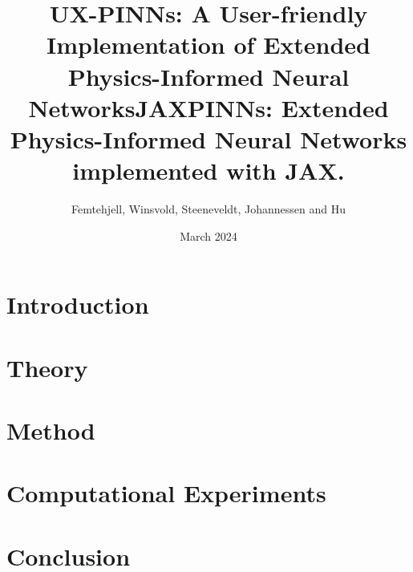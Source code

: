 \documentclass[aps,rmp,reprint,amsmath,amssymb,longbibliography,twocolumn,floatfix]{revtex4-1}
\begin{document}

\title{UX-PINNs: A User-friendly Implementation of Extended Physics-Informed Neural Networks}
\title{JAXPINNs: Extended Physics-Informed Neural Networks implemented with JAX.}

\author{Femtehjell, Winsvold, Steeneveldt, Johannessen and Hu}
\date{March 2024}


\begin{abstract}

\end{abstract}

\maketitle

\tableofcontents

\section{Introduction}
\label{sec:introduction}

\section{Theory}
\label{sec:theory}

\section{Method}
\label{sec:method}

\section{Computational Experiments}
\label{sec:compexp}

\section{Conclusion}
\label{sec:conclusion}

\newpage

\appendix

\end{document}
